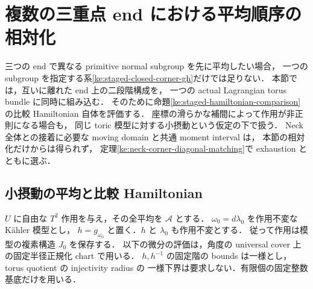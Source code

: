 \section{複数の三重点 end における平均順序の相対化}
\label{ke:relative-corner-section}

三つの end で異なる primitive normal subgroup を先に平均したい場合，
一つの subgroup を指定する系\ref{ke:staged-closed-corner-gh}だけでは足りない．
本節では，互いに離れた end 上の二段階構成を，
一つの actual Lagrangian torus bundle に同時に組み込む．
そのために命題\ref{ke:staged-hamiltonian-comparison}の比較 Hamiltonian 自体を評価する．
座標の滑らかな補間によって作用が非正則になる場合も，
同じ toric 模型に対する小摂動という仮定の下で扱う．
Neck 全体との接着に必要な moving domain と共通 moment interval は，
本節の相対化だけからは得られず，
定理\ref{ke:neck-corner-diagonal-matching}で exhaustion とともに選ぶ．

\subsection{小摂動の平均と比較 Hamiltonian}

$U$ に自由な $T^2$ 作用を与え，その全平均を $\mathcal A$ とする．
$\omega_0=d\lambda_0$ を作用不変な K\"ahler 模型とし，
$h=g_{\omega_0}$ と置く．$h$ と $\lambda_0$ も作用不変とする．
従って作用は模型の複素構造 $J_0$ を保存する．
以下の微分の評価は，角度の universal cover 上の固定半径正規化 chart で用いる．
$h,h^{-1}$ の固定階の bounds は一様とし，torus quotient の injectivity radius の
一様下界は要求しない．有限個の固定整数基底だけを用いる．

